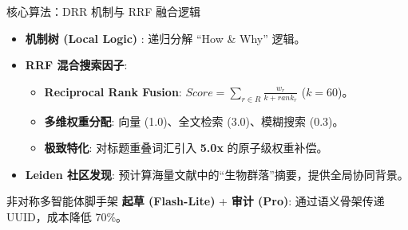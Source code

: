 \documentclass[aspectratio=169, 11pt]{ctexbeamer}
\begin{document}
\begin{frame}{核心算法：DRR 机制与 RRF 融合逻辑}
    \begin{itemize}
        \item \textbf{机制树 (Local Logic)} \cite{zhu2025taxonomy}: 递归分解 “How \& Why” 逻辑。
        \item \textbf{RRF 混合搜索因子}:
        \begin{itemize}
            \item \textbf{Reciprocal Rank Fusion}: $Score = \sum_{r \in R} \frac{w_r}{k + rank_r}$ ($k=60$)。
            \item \textbf{多维权重分配}: 向量 (1.0)、全文检索 (3.0)、模糊搜索 (0.3)。
            \item \textbf{极致特化}: 对标题重叠词汇引入 \textbf{5.0x} 的原子级权重补偿。
        \end{itemize}
        \item \textbf{Leiden 社区发现}: 预计算海量文献中的“生物群落”摘要，提供全局协同背景。
    \end{itemize}
    \vspace{0.2cm}
    \begin{block}{非对称多智能体脚手架}
        \small \textbf{起草 (Flash-Lite)} + \textbf{审计 (Pro)}: 通过语义骨架传递 UUID，成本降低 70\%。
    \end{block}
\end{frame}
\end{document}
